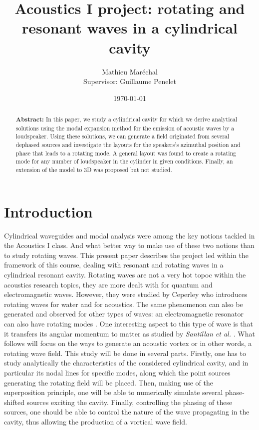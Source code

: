 \documentclass[%
 reprint,
 amsmath,amssymb,
 aps,
]{revtex4-2}
\begin{document}
\title{Acoustics I project: rotating and resonant waves in a cylindrical cavity}
\author{Mathieu Maréchal\\ Supervisor: Guillaume Penelet}
%
\date{\today}

\begin{abstract}
    \textbf{Abstract:} In this paper, we study a cylindrical cavity for which we derive analytical solutions using the modal expansion method for the emission of acoustic waves by a loudspeaker. Using these solutions, we can generate a field originated from several dephased sources and investigate the layouts for the speakers's azimuthal position and phase that leads to a rotating mode. A general layout was found to create a rotating mode for any number of loudspeaker in the cylinder in given conditions. Finally, an extension of the model to 3D was proposed but not studied.
\end{abstract}

\maketitle
\section{Introduction}
Cylindrical waveguides and modal analysis were among the key notions tackled in the Acoustics I class. And what better way to make use of these two notions than to study rotating waves. This present paper describes the project led within the framework of this course, dealing with resonant and rotating waves in a cylindrical resonant cavity. Rotating waves are not a very hot topoc within the acoustics research topics, they are more dealt with for quantum and electromagnetic waves. However, they were studied by Ceperley \cite{ceperley2002} who introduces rotating waves for water and for acoustics. The same phenomenon can also be generated and observed for other types of waves: an electromagnetic resonator can also have rotating modes \cite{ceperley1995}. One interesting aspect to this type of wave is that it transfers its angular momentum to matter as studied by \emph{Santillan et al.} \cite{santillan2009}. What follows will focus on the ways to generate an acoustic vortex or in other words, a rotating wave field. This study will be done in several parts. Firstly, one has to study analytically the characteristics of the considered cylindrical cavity, and in particular its nodal lines for specific modes, along which the point sources generating the rotating field will be placed. Then, making use of the superposition principle, one will be able to numerically simulate several phase-shifted sources exciting the cavity. Finally, controlling the phasing of these sources, one should be able to control the nature of the wave propagating in the cavity, thus allowing the production of a vortical wave field. 
\end{document}
